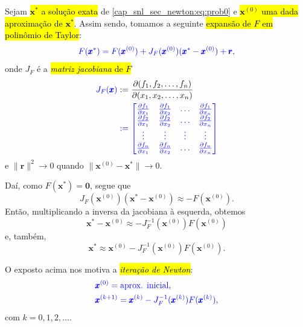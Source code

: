 Sejam \hl{$\pmb{x}^*$ a solução exata} de \eqref{cap_snl_sec_newton:eq:prob0} e \hl{$\pmb{x}^{(0)}$ uma dada aproximação de $\pmb{x}^*$}. Assim sendo, tomamos a seguinte \hl{expansão de $F$ em polinômio de Taylor}{\taylor}:
\begin{equation}\color{blue}F(\pmb{x}^*) = F(\pmb{x}^{(0)}) + J_F(\pmb{x}^{(0)})(\pmb{x}^*-\pmb{x}^{(0)}) + \pmb{r},
\end{equation}
onde $J_F$ é a \hl{\emph{matriz jacobiana}{\jacobi} de $F$}
\begin{align}
  \color{blue}J_F(\pmb{x}) &:= \frac{\partial(f_1, f_2, \dotsc, f_n)}{\partial(x_1, x_2, \dotsc, x_n)}\\
  &\color{blue}:= \begin{bmatrix}
    \frac{\partial f_1}{\partial x_1} & \frac{\partial f_1}{\partial x_2} & \ldots & \frac{\partial f_1}{\partial x_n}\\
    \frac{\partial f_2}{\partial x_1} & \frac{\partial f_2}{\partial x_2} & \ldots & \frac{\partial f_2}{\partial x_n}\\
    \vdots & \vdots & \vdots & \vdots \\
    \frac{\partial f_n}{\partial x_1} & \frac{\partial f_n}{\partial x_2} & \ldots & \frac{\partial f_n}{\partial x_n}\\
  \end{bmatrix}
\end{align}
e $\|\pmb{r}\|^2\to 0$ quando $\|\pmb{x}^{(0)}-\pmb{x}^*\|\to 0$. 

Daí, como $F(\pmb{x}^*) = \pmb{0}$, segue que
\begin{equation}
  J_F(\pmb{x}^{(0)})(\pmb{x}^*-\pmb{x}^{(0)}) \approx -F(\pmb{x}^{(0)}).
\end{equation}
Então, multiplicando a inversa da jacobiana à esquerda, obtemos
\begin{equation}
  \pmb{x}^*-\pmb{x}^{(0)} \approx - J_F^{-1}(\pmb{x}^{(0)})F(\pmb{x}^{(0)})
\end{equation}
e, também,
\begin{equation}
  \pmb{x}^* \approx \pmb{x}^{(0)} - J_F^{-1}(\pmb{x}^{(0)})F(\pmb{x}^{(0)}).
\end{equation}

O exposto acima nos motiva a \hl{\emph{iteração de Newton}}{\newton}:
\begin{subequations}\hleq
  \begin{align}
    &\pmb{x}^{(0)} = \text{aprox. inicial},\\
    &\pmb{x}^{(k+1)} = \pmb{x}^{(k)} - J_F^{-1}(\pmb{x}^{(k)})F(\pmb{x}^{(k)}),
  \end{align}
\end{subequations}
com $k=0, 1, 2, \ldots$.


